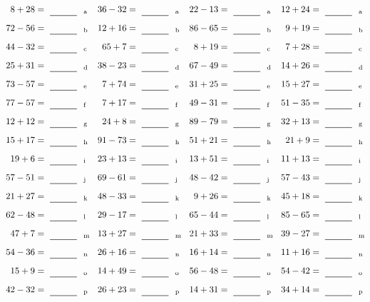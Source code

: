 \documentclass
[
  draft    = true,
  fontsize = 11pt,
  parskip  = half-
]
{scrartcl}
\begin{document}
\clearpage
\begin{align*}
    \pline{8+28}&=\rline{a}
  & \pline{36-32}&=\rline{a}
  & \pline{22-13}&=\rline{a}
  & \pline{12+24}&=\rline{a} \\[1ex]
    \pline{72-56}&=\rline{b}
  & \pline{12+16}&=\rline{b}
  & \pline{86-65}&=\rline{b}
  & \pline{9+19}&=\rline{b} \\[1ex]
    \pline{44-32}&=\rline{c}
  & \pline{65+7}&=\rline{c}
  & \pline{8+19}&=\rline{c}
  & \pline{7+28}&=\rline{c} \\[1ex]
    \pline{25+31}&=\rline{d}
  & \pline{38-23}&=\rline{d}
  & \pline{67-49}&=\rline{d}
  & \pline{14+26}&=\rline{d} \\[1ex]
    \pline{73-57}&=\rline{e}
  & \pline{7+74}&=\rline{e}
  & \pline{31+25}&=\rline{e}
  & \pline{15+27}&=\rline{e} \\[1ex]
    \pline{77-57}&=\rline{f}
  & \pline{7+17}&=\rline{f}
  & \pline{49-31}&=\rline{f}
  & \pline{51-35}&=\rline{f} \\[1ex]
    \pline{12+12}&=\rline{g}
  & \pline{24+8}&=\rline{g}
  & \pline{89-79}&=\rline{g}
  & \pline{32+13}&=\rline{g} \\[1ex]
    \pline{15+17}&=\rline{h}
  & \pline{91-73}&=\rline{h}
  & \pline{51+21}&=\rline{h}
  & \pline{21+9}&=\rline{h} \\[1ex]
    \pline{19+6}&=\rline{i}
  & \pline{23+13}&=\rline{i}
  & \pline{13+51}&=\rline{i}
  & \pline{11+13}&=\rline{i} \\[1ex]
    \pline{57-51}&=\rline{j}
  & \pline{69-61}&=\rline{j}
  & \pline{48-42}&=\rline{j}
  & \pline{57-43}&=\rline{j} \\[1ex]
    \pline{21+27}&=\rline{k}
  & \pline{48-33}&=\rline{k}
  & \pline{9+26}&=\rline{k}
  & \pline{45+18}&=\rline{k} \\[1ex]
    \pline{62-48}&=\rline{l}
  & \pline{29-17}&=\rline{l}
  & \pline{65-44}&=\rline{l}
  & \pline{85-65}&=\rline{l} \\[1ex]
    \pline{47+7}&=\rline{m}
  & \pline{13+27}&=\rline{m}
  & \pline{21+33}&=\rline{m}
  & \pline{39-27}&=\rline{m} \\[1ex]
    \pline{54-36}&=\rline{n}
  & \pline{26+16}&=\rline{n}
  & \pline{16+14}&=\rline{n}
  & \pline{11+16}&=\rline{n} \\[1ex]
    \pline{15+9}&=\rline{o}
  & \pline{14+49}&=\rline{o}
  & \pline{56-48}&=\rline{o}
  & \pline{54-42}&=\rline{o} \\[1ex]
    \pline{42-32}&=\rline{p}
  & \pline{26+23}&=\rline{p}
  & \pline{14+31}&=\rline{p}
  & \pline{34+14}&=\rline{p}
\end{align*}
\end{document}
